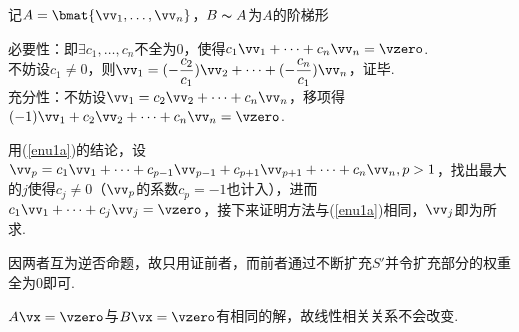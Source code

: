 \begin{analysis}
记$A=\bmat{\vv_1,\ldots,\vv_n}$，$B\thicksim A$为$A$的阶梯形
\begin{partlist}
	\item \label{enu1a}必要性：即$\exists c_1,\dots,c_n$不全为$0$，使得$c_1\vv_1+\cdots+c_n\vv_n=\vzero$.\\
	不妨设$c_1\ne 0$，则$\vv_1=(-\dfrac{c_2}{c_1})\vv_2+\cdots+(-\dfrac{c_n}{c_1})\vv_n$，证毕.\\
	充分性：不妨设$\vv_1=c_2\vv_2+\cdots+c_n\vv_n$，移项得$(-1)\vv_1+c_2\vv_2+\cdots+c_n\vv_n=\vzero$.
	\item 用(\ref{enu1a})的结论，设$\vv_p=c_1\vv_1+\cdots+c_{p-1}\vv_{p-1}+c_{p+1}\vv_{p+1}+\cdots+c_n\vv_n,p>1$，找出最大的$j$使得$c_j\ne 0$（$\vv_p$的系数$c_p=-1$也计入），进而$c_1\vv_1+\cdots+c_j\vv_j=\vzero$，接下来证明方法与(\ref{enu1a})相同，$\vv_j$即为所求.
	\item 因两者互为逆否命题，故只用证前者，而前者通过不断扩充$S'$并令扩充部分的权重全为$0$即可.
	\item $A\vx=\vzero$与$B\vx=\vzero$有相同的解，故线性相关关系不会改变.
\end{partlist}
\end{analysis}

